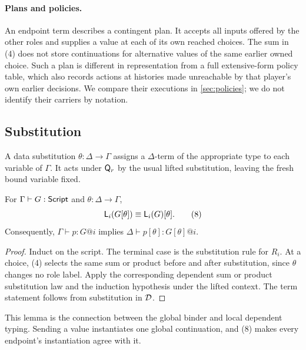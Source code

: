 \paragraph{Plans and policies.}
An endpoint term describes a contingent plan. It accepts all inputs offered by
the other roles and supplies a value at each of its own reached choices. The
sum in (4) does not store continuations for alternative values of the same
earlier owned choice. Such a plan is different in representation from a full
extensive-form policy table, which also records actions at histories made
unreachable by that player's own earlier decisions. We compare their
executions in \cref{sec:policies}; we do not identify their carriers by
notation.

\subsection{Substitution}

A data substitution $\theta:\Delta\to\Gamma$ assigns a $\Delta$-term of the
appropriate type to each variable of $\Gamma$. It acts under $\mathsf Q_r$ by the
usual lifted substitution, leaving the fresh bound variable fixed.

\begin{lemma}
\label{lem:substitution}
For $\Gamma\vdash G:\mathsf{Script}$ and $\theta:\Delta\to\Gamma$,
\[
 \mathsf L_{i}(G[\theta])\mathrel{\equiv}\mathsf L_{i}(G)[\theta].
 \tag{8}
\]
Consequently, $\Gamma\vdash p:G@i$ implies
$\Delta\vdash p[\theta]:G[\theta]@i$.
\end{lemma}
\begin{proof}
Induct on the script. The terminal case is the substitution rule for $R_i$.
At a choice, (4) selects the same sum or product before and after
substitution, since $\theta$ changes no role label. Apply the corresponding
dependent sum or product substitution law and the induction hypothesis under
the lifted context. The term statement follows from substitution in $\mathcal D$.
\end{proof}

This lemma is the connection between the global binder and local dependent
typing. Sending a value instantiates one global continuation, and (8) makes
every endpoint's instantiation agree with it.
